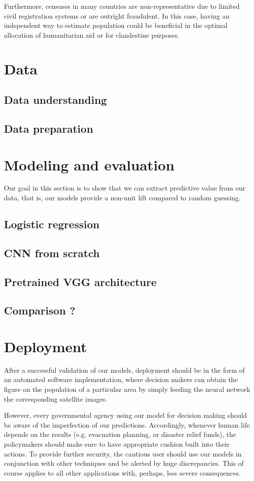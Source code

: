 \documentclass{article}
\begin{document}
Furthermore, censuses in many countries are non-representative due to limited civil registration systems or are outright fraudulent. In this case, having an independent way to estimate population could be beneficial in the optimal allocation of humanitarian aid or for clandestine purposes.

\section{Data}
\subsection{Data understanding}

\subsection{Data preparation}
\section{Modeling and evaluation}
Our goal in this section is to show that we can extract predictive value from our data, that is, our models provide a non-unit lift compared to random guessing.
\subsection{Logistic regression}
\subsection{CNN from scratch}
\subsection{Pretrained VGG architecture}
\subsection{Comparison ?}
\section{Deployment}
After a successful validation of our models, deployment should be in the form of an automated software implementation, where decision makers can obtain the figure on the population of a particular area by simply feeding the neural network the corresponding satellite images.

However, every governmental agency using our model for decision making should be aware of the imperfection of our predictions. Accordingly, whenever human life depends on the results (e.g. evacuation planning, or disaster relief funds), the policymakers should make sure to have appropriate cushion built into their actions. To provide further security, the cautious user should use our models in conjunction with other techniques and be alerted by huge discrepancies. This of course applies to all other applications with, perhaps, less severe consequences.
\end{document}
